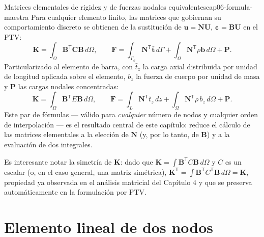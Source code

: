 \begin{ecnimportante}{Matrices elementales de rigidez y de fuerzas nodales equivalentes}{cap06-formula-maestra}
Para cualquier elemento finito, las matrices que gobiernan su comportamiento discreto se obtienen de la sustitución de $\bm u = \bm N\bm U$, $\bm\varepsilon = \bm B\bm U$ en el PTV:
\[
\bm K = \int_\Omega \bm B^{\mathsf T}\bm C\bm B \, d\Omega, \qquad
\bm F = \int_{\Gamma_\sigma} \bm N^{\mathsf T} \bar{\bm t}\, d\Gamma + \int_\Omega \bm N^{\mathsf T} \rho \bm b\, d\Omega + \bm P .
\]
Particularizado al elemento de barra, con $\bar t_z$ la carga axial distribuida por unidad de longitud aplicada sobre el elemento, $b_z$ la fuerza de cuerpo por unidad de masa y $\bm P$ las cargas nodales concentradas:
\[
\bm K = \int_\Omega \bm B^{\mathsf T} E \bm B\, d\Omega, \qquad
\bm F = \int_{L} \bm N^{\mathsf T} \bar t_z\, dz + \int_\Omega \bm N^{\mathsf T} \rho\, b_z \, d\Omega + \bm P .
\]
Este par de fórmulas --- válido para \emph{cualquier} número de nodos y cualquier orden de interpolación --- es el resultado central de este capítulo: reduce el cálculo de las matrices elementales a la elección de $\bm N$ (y, por lo tanto, de $\bm B$) y a la evaluación de dos integrales.
\end{ecnimportante}

Es interesante notar la simetría de $\bm K$: dado que $\bm K = \int \bm B^{\mathsf T} C \bm B \,d\Omega$ y $C$ es un escalar (o, en el caso general, una matriz simétrica), $\bm K^{\mathsf T} = \int \bm B^{\mathsf T} C^{\mathsf T} \bm B\, d\Omega = \bm K$, propiedad ya observada en el análisis matricial del Capítulo 4 y que se preserva automáticamente en la formulación por PTV.

\section{Elemento lineal de dos nodos}
\label{sec:cap06-elemento-2nodos}

